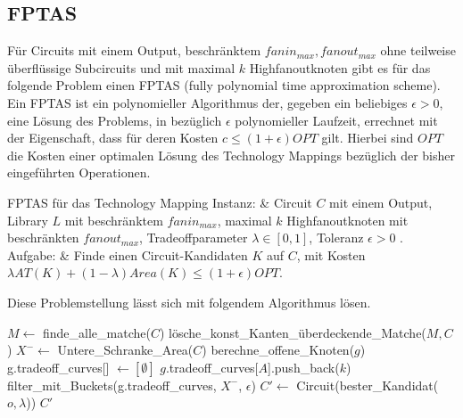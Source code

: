 \documentclass[11pt, a4paper, german]{article}
\newcommand{\TM}{Technology  Mapping }
\begin{document}
\subsection{FPTAS}
\label{subsec:fptas}
Für Circuits mit einem Output, beschränktem $fanin_{max}, fanout_{max}$ ohne teilweise überflüssige Subcircuits und mit maximal $k$ Highfanoutknoten gibt es für das folgende Problem einen FPTAS (fully polynomial time approximation scheme). Ein FPTAS ist ein polynomieller Algorithmus der, gegeben ein beliebiges $\epsilon > 0$, eine Lösung des Problems, in bezüglich $\epsilon$  polynomieller Laufzeit, errechnet mit der Eigenschaft, dass für deren Kosten $c \leq (1+\epsilon)OPT$ gilt. Hierbei sind $OPT$ die Kosten einer optimalen Lösung des Technology Mappings bezüglich der bisher eingeführten Operationen.\\
 \begin{problem}[framed]{FPTAS für das \TM}
  Instanz:  & Circuit $C$ mit einem Output, Library $L$ mit beschr\"anktem $fanin_{max}$, maximal $k$ Highfanoutknoten mit beschränkten $fanout_{max}$, Tradeoffparameter $\lambda \in [0,1]$, Toleranz $\epsilon > 0$ .\\
  Aufgabe: &  Finde einen Circuit-Kandidaten $K$ auf $C$, mit Kosten $\lambda AT(K) + (1-\lambda)Area(K) \leq (1+\epsilon)OPT$.
\end{problem}
Diese Problemstellung lässt sich mit folgendem Algorithmus lösen.\\

\LinesNumbered
\begin{algorithm}[H]
\DontPrintSemicolon
\caption{FPTAS f\"ur das TM mit Konvexkombination}

   $M \gets$ finde\_alle\_matche($C$)\;
   lösche\_konst\_Kanten\_überdeckende\_Matche($M, C$)\;
   $X^- \gets$ Untere\_Schranke\_Area($C$)\;
        {
			berechne\_offene\_Knoten($g$)\;	 
        }
  {
    g.tradeoff\_curves[] $\gets [\emptyset]$\;
    {
      {
        {
        	 {
			$g$.tradeoff\_curves[$A$].push\_back($k$)\;      	 
        	 }  
        }
      }
    }
    filter\_mit\_Buckets(g.tradeoff\_curves, $X^-$, $\epsilon$)\;
  }
  $C' \gets $ Circuit(bester\_Kandidat($o, \lambda$))\;
  \Return $C'$\;
\end{algorithm}\ \\
\end{document}
